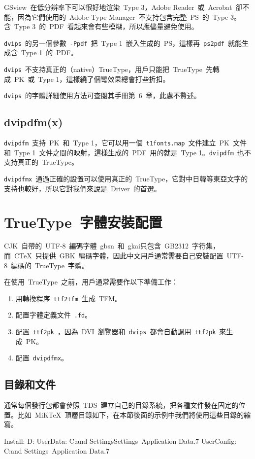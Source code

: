 GSview~在低分辨率下可以很好地渲染~Type 3，Adobe Reader~或~Acrobat~卻不能，因為它們使用的~Adobe Type Manager~不支持包含完整~PS~的~Type 3。含~Type 3~的~PDF~看起來會有些模糊，所以應儘量避免使用。

\verb|dvips|~的另一個參數~\verb|-Ppdf|~把~Type 1~嵌入生成的~PS，這樣再~\verb|ps2pdf|~就能生成含~Type 1~的~PDF。

\verb|dvips|~不支持真正的（native）TrueType，用戶只能把~TrueType~先轉成~PK~或~Type 1，這樣繞了個彎效果總會打些折扣。

\verb|dvips|~的字體詳細使用方法可查閱其手冊\citep{Rokicki_2005}第~6~章，此處不贅述。

\subsection{dvipdfm(x)}
\verb|dvipdfm|~支持~PK~和~Type 1，它可以用一個~\verb|t1fonts.map|~文件建立~PK~文件和~Type 1~文件之間的映射，這樣生成的~PDF~用的就是~Type 1。\verb|dvipdfm|~也不支持真正的~TrueType。

\verb|dvipdfmx|~通過正確的設置可以使用真正的~TrueType，它對中日韓等東亞文字的支持也較好，所以它對我們來說是~Driver~的首選。

\section{TrueType~字體安裝配置}
CJK~自帶的~UTF-8~編碼字體~gbsn~和~gkai只包含~GB2312~字符集，而~CTeX~只提供~GBK~編碼字體，因此中文用戶通常需要自己安裝配置~UTF-8~編碼的~TrueType~字體。

在使用~TrueType~之前，用戶通常需要作以下準備工作：
\begin{enumerate}
    \item 用轉換程序~\verb|ttf2tfm|~生成~TFM。
    \item 配置字體定義文件~\verb|.fd|。
    \item 配置~\verb|ttf2pk|~，因為~DVI~瀏覽器和~\verb|dvips|~都會自動調用~\verb|ttf2pk|~來生成~PK。
    \item 配置~\verb|dvipdfmx|。
\end{enumerate}

\subsection{目錄和文件}
通常每個發行包都會參照~TDS~建立自己的目錄系統，把各種文件發在固定的位置。比如~MiKTeX~頂層目錄如下，在本節後面的示例中我們將使用這些目錄的縮寫。
\begin{code}
Install: D:\edit{}
UserData: C:\Documents and Settings\Alpha\Local Settings\
    Application Data\MiKTeX\2.7
UserConfig: C:\Documents and Settings\Alpha\
    Application Data\MiKTeX\2.7
\end{code}

